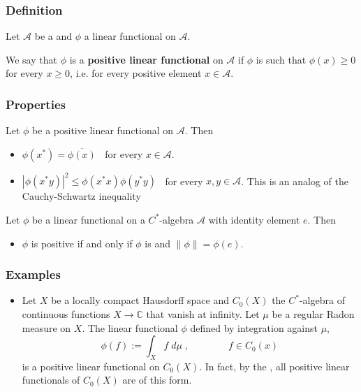 \documentclass[12pt]{article}
\begin{document}
\subsubsection{Definition}
Let $\mathcal{A}$ be a  and $\phi$ a linear functional on $\mathcal{A}$.

We say that $\phi$ is a {\bf positive linear functional} on $\mathcal{A}$ if $\phi$ is such that $\phi(x)\geq 0$ for every $x \geq 0$, i.e. for every positive element $x \in \mathcal{A}$.

\subsubsection{Properties}
Let $\phi$ be a positive linear functional on $\mathcal{A}$. Then

\begin{itemize}
\item $\phi(x^*) = \overline{\phi(x)}\;\;$ for every $x \in \mathcal{A}$.
\end{itemize}
\begin{itemize}
\item $|\phi(x^*y)|^2 \leq \phi(x^*x)\phi(y^*y)\;\;$ for every $x, y \in \mathcal{A}$. This is an analog of the Cauchy-Schwartz inequality
\end{itemize}

Let $\phi$ be a linear functional on a $C^*$-algebra $\mathcal{A}$ with identity element $e$. Then
\begin{itemize}
\item $\phi$ is positive if and only if $\phi$ is  and $\|\phi\|= \phi(e)$.
\end{itemize}

\subsubsection{Examples}
\begin{itemize}
\item Let $X$ be a locally compact Hausdorff space and $C_0(X)$ the $C^*$-algebra of continuous functions $X \longrightarrow \mathbb{C}$ that vanish at infinity. Let $\mu$ be a regular Radon measure on $X$. The linear functional $\phi$ defined by integration against $\mu$,
\begin{displaymath}
\phi(f) := \int_X f\;d\mu\;, \qquad\qquad f \in C_0(x)
\end{displaymath}
is a positive linear functional on $C_0(X)$. In fact, by the , all positive linear functionals of $C_0(X)$ are of this form.
\end{itemize}
\end{document}

